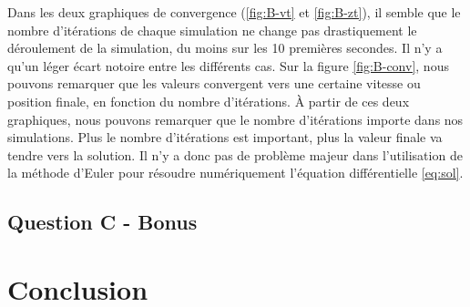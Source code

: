 \documentclass[a4paper,12pt,twoside]{article}
\begin{document}
Dans les deux graphiques de convergence (\ref{fig:B-vt} et \ref{fig:B-zt}), il semble que le nombre d'itérations de chaque simulation ne change pas drastiquement le déroulement de la simulation, du moins sur les 10 premières secondes. Il n'y a qu'un léger écart notoire entre les différents cas. Sur la figure \ref{fig:B-conv}, nous pouvons remarquer que les valeurs convergent vers une certaine vitesse ou position finale, en fonction du nombre d'itérations. À partir de ces deux graphiques, nous pouvons remarquer que le nombre d'itérations importe dans nos simulations. Plus le nombre d'itérations est important, plus la valeur finale va tendre vers la solution. Il n'y a donc pas de problème majeur dans l'utilisation de la méthode d'Euler pour résoudre numériquement l'équation différentielle \ref{eq:sol}.

\subsection{Question C - Bonus}

\section{Conclusion}
\end{document}
